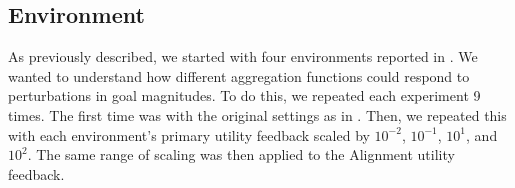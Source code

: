 \subsection{Environment}

As previously described, we started with four environments reported in \cite{vamplew_potential-based_2021}. We wanted to understand how different aggregation functions could respond to perturbations in goal magnitudes. To do this, we repeated each experiment 9 times. The first time was with the original settings as in \cite{vamplew_potential-based_2021}. Then, we repeated this with each environment's primary utility feedback scaled by $10^{-2}$, $10^{-1}$, $10^1$, and $10^2$. The same range of scaling was then applied to the Alignment utility feedback.


